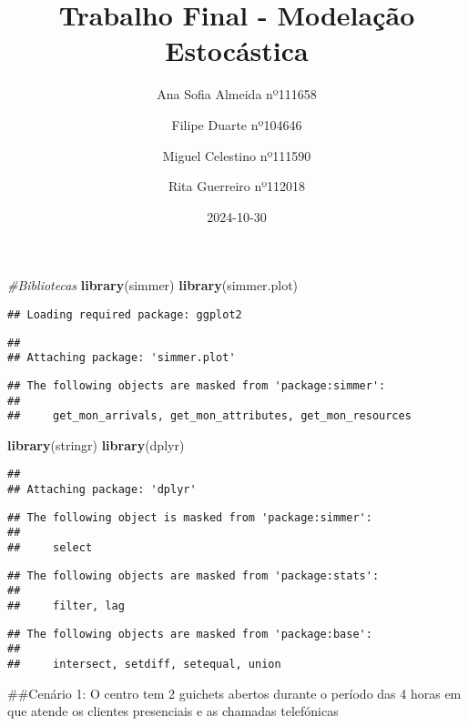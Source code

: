 \documentclass[
]{article}
\title{Trabalho Final - Modelação Estocástica}
\author{Ana Sofia Almeida nº111658 \and Filipe Duarte
nº104646 \and Miguel Celestino nº111590 \and Rita Guerreiro nº112018}
\date{2024-10-30}
\newenvironment{Shaded}{\begin{snugshade}}{\end{snugshade}}
\newcommand{\CommentTok}[1]{\textcolor[rgb]{0.56,0.35,0.01}{\textit{#1}}}
\newcommand{\FunctionTok}[1]{\textcolor[rgb]{0.13,0.29,0.53}{\textbf{#1}}}
\newcommand{\NormalTok}[1]{#1}
\begin{document}
\maketitle

\begin{Shaded}
\begin{Highlighting}[]
\CommentTok{\#Bibliotecas}
\FunctionTok{library}\NormalTok{(simmer)}
\FunctionTok{library}\NormalTok{(simmer.plot)}
\end{Highlighting}
\end{Shaded}

\begin{verbatim}
## Loading required package: ggplot2
\end{verbatim}

\begin{verbatim}
## 
## Attaching package: 'simmer.plot'
\end{verbatim}

\begin{verbatim}
## The following objects are masked from 'package:simmer':
## 
##     get_mon_arrivals, get_mon_attributes, get_mon_resources
\end{verbatim}

\begin{Shaded}
\begin{Highlighting}[]
\FunctionTok{library}\NormalTok{(stringr)}
\FunctionTok{library}\NormalTok{(dplyr)}
\end{Highlighting}
\end{Shaded}

\begin{verbatim}
## 
## Attaching package: 'dplyr'
\end{verbatim}

\begin{verbatim}
## The following object is masked from 'package:simmer':
## 
##     select
\end{verbatim}

\begin{verbatim}
## The following objects are masked from 'package:stats':
## 
##     filter, lag
\end{verbatim}

\begin{verbatim}
## The following objects are masked from 'package:base':
## 
##     intersect, setdiff, setequal, union
\end{verbatim}

\#\#Cenário 1: O centro tem 2 guichets abertos durante o período das 4
horas em que atende os clientes presenciais e as chamadas telefónicas
\end{document}
